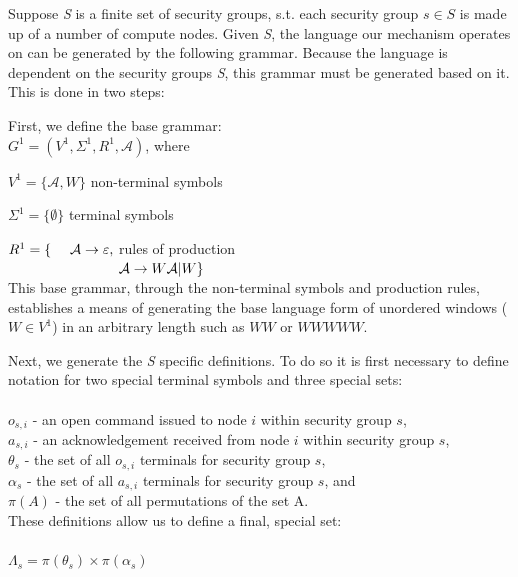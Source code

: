 \documentclass[oneside,12pt]{memoir}
\newcommand{\tab}{\hspace*{2em}}
\begin{document}
Suppose \emph{S} is a finite set of security groups, s.t. each security group $s\in S$ is made up of a number of compute nodes. Given \emph{S}, the language our mechanism operates on can be generated by the following grammar. Because the language is dependent on the security groups \emph{S}, this grammar must be generated based on it. This is done in two steps:

First, we define the base grammar:\\

\tab $G^1 = (V^1, \Sigma^1, R^1, \mathcal{A})$, where

\tab $V^1 = \{\mathcal{A} , W\}$ \hfill non-terminal symbols \hspace*{6em}

\tab $\Sigma ^1 = \{ \emptyset\}$ \hfill terminal symbols\hspace*{6.3em}

\tab $R^1 = \lbrace \hspace*{1.35em}\mathcal{A} \rightarrow \varepsilon ,$ \hfill rules of production \hspace*{6em} \\
$\tab \hspace*{5.9em} \mathcal{A}\rightarrow W\mathcal{A} |W\rbrace$\\

This base grammar, through the non-terminal symbols and production rules, establishes a means of generating the base language form of unordered windows ($W\in V^1$) in an arbitrary length such as $WW$ or $WWWWW$.

Next, we generate the \emph{S} specific definitions. To do so it is first necessary to define notation for two special terminal symbols and three special sets:\\
\\
$o_{s,i}$ - an open command issued to node $i$ within security group $s$,\\
$a_{s,i}$ - an acknowledgement received from node $i$ within security group $s$,\\
$\theta_s$ - the set of all $o_{s,i}$ terminals for security group $s$, \\
$\alpha_s$ - the set of all $a_{s,i}$ terminals for security group $s$, and \\
$\pi(A)$ - the set of all permutations of the set A.\\

These definitions allow us to define a final, special set:\\
\\
$\Lambda_s = \pi(\theta_s) \times \pi(\alpha_s)$\\
\end{document}
